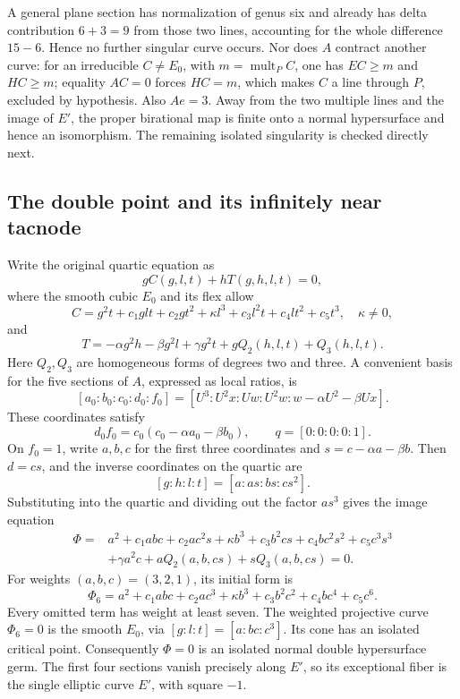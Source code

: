 A general plane section has normalization of genus six and already has delta contribution \(6+3=9\) from those two lines, accounting for the whole difference \(15-6\). Hence no further singular curve occurs. Nor does \(A\) contract another curve: for an irreducible \(C\ne E_0\), with \(m=\operatorname{mult}_P C\), one has \(EC\ge m\) and \(HC\ge m\); equality \(AC=0\) forces \(HC=m\), which makes \(C\) a line through \(P\), excluded by hypothesis. Also \(Ae=3\). Away from the two multiple lines and the image of \(E'\), the proper birational map is finite onto a normal hypersurface and hence an isomorphism. The remaining isolated singularity is checked directly next.

\subsection{The double point and its infinitely near tacnode}

Write the original quartic equation as \[
gC(g,l,t)+hT(g,h,l,t)=0,
\] where the smooth cubic \(E_0\) and its flex allow \[
C=g^2t+c_1glt+c_2gt^2+\kappa l^3+c_3l^2t+c_4lt^2+c_5t^3,
\quad\kappa\ne0,
\] and \[
T=-\alpha g^2h-\beta g^2l+\gamma g^2t+gQ_2(h,l,t)+Q_3(h,l,t).
\] Here \(Q_2,Q_3\) are homogeneous forms of degrees two and three. A convenient basis for the five sections of \(A\), expressed as local ratios, is \[
[a_0:b_0:c_0:d_0:f_0]
=[U^3:U^2x:Uw:U^2w:w-\alpha U^2-\beta Ux].
\] These coordinates satisfy \[
d_0f_0=c_0(c_0-\alpha a_0-\beta b_0),\qquad
q=[0:0:0:0:1].
\] On \(f_0=1\), write \(a,b,c\) for the first three coordinates and \(s=c-\alpha a-\beta b\). Then \(d=cs\), and the inverse coordinates on the quartic are \[
[g:h:l:t]=[a:as:bs:cs^2].
\] Substituting into the quartic and dividing out the factor \(as^3\) gives the image equation \[
\begin{aligned}
\Phi={}&a^2+c_1abc+c_2ac^2s+\kappa b^3+c_3b^2cs
+c_4bc^2s^2+c_5c^3s^3\\
&+\gamma a^2c+aQ_2(a,b,cs)+sQ_3(a,b,cs)=0.
\end{aligned}
\] For weights \((a,b,c)=(3,2,1)\), its initial form is \[
\Phi_6=a^2+c_1abc+c_2ac^3+\kappa b^3
+c_3b^2c^2+c_4bc^4+c_5c^6.
\] Every omitted term has weight at least seven. The weighted projective curve \(\Phi_6=0\) is the smooth \(E_0\), via \([g:l:t]=[a:bc:c^3]\). Its cone has an isolated critical point. Consequently \(\Phi=0\) is an isolated normal double hypersurface germ. The first four sections vanish precisely along \(E'\), so its exceptional fiber is the single elliptic curve \(E'\), with square \(-1\).

